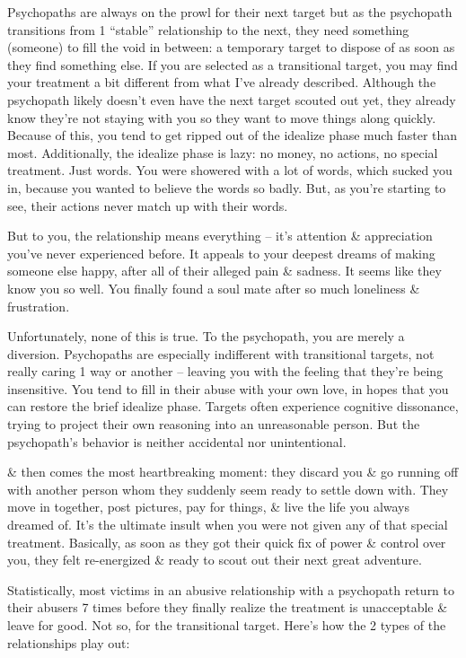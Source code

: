 \documentclass{article}
\numberwithin{equation}{section}
\begin{document}
Psychopaths are always on the prowl for their next target but as the psychopath transitions from 1 ``stable'' relationship to the next, they need something (someone) to fill the void in between: a temporary target to dispose of as soon as they find something else. If you are selected as a transitional target, you may find your treatment a bit different from what I've already described. Although the psychopath likely doesn't even have the next target scouted out yet, they already know they're not staying with you so they want to move things along quickly. Because of this, you tend to get ripped out of the idealize phase much faster than most. Additionally, the idealize phase is lazy: no money, no actions, no special treatment. Just words. You were showered with a lot of words, which sucked you in, because you wanted to believe the words so badly. But, as you're starting to see, their actions never match up with their words.

But to you, the relationship means everything -- it's attention \& appreciation you've never experienced before. It appeals to your deepest dreams of making someone else happy, after all of their alleged pain \& sadness. It seems like they know you so well. You finally found a soul mate after so much loneliness \& frustration.

Unfortunately, none of this is true. To the psychopath, you are merely a diversion. Psychopaths are especially indifferent with transitional targets, not really caring 1 way or another -- leaving you with the feeling that they're being insensitive. You tend to fill in their abuse with your own love, in hopes that you can restore the brief idealize phase. Targets often experience cognitive dissonance, trying to project their own reasoning into an unreasonable person. But the psychopath's behavior is neither accidental nor unintentional.

\& then comes the most heartbreaking moment: they discard you \& go running off with another person whom they suddenly seem ready to settle down with. They move in together, post pictures, pay for things, \& live the life you always dreamed of. It's the ultimate insult when you were not given any of that special treatment. Basically, as soon as they got their quick fix of power \& control over you, they felt re-energized \& ready to scout out their next great adventure.

Statistically, most victims in an abusive relationship with a psychopath return to their abusers 7 times before they finally realize the treatment is unacceptable \& leave for good. Not so, for the transitional target. Here's how the 2 types of the relationships play out:
\end{document}
